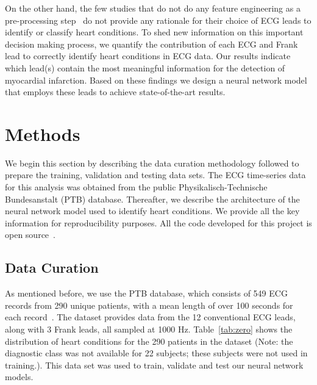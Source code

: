 \documentclass{svproc}
\begin{document}
On the other hand, the few studies that do not do any feature engineering as a pre-processing step~\cite{acharya, liu2} do not provide any rationale for their choice of ECG leads to identify or classify heart conditions. To shed new information on this important decision making process, we quantify the contribution of each ECG and Frank lead to correctly identify heart conditions in ECG data. Our results indicate which lead(s) contain the most meaningful information for the detection of myocardial infarction. Based on these findings we design a neural network model that employs these leads to achieve state-of-the-art results.

\section{Methods}
  
We begin this section by describing the data curation methodology followed to prepare the training, validation and testing data sets. The ECG time-series data for this analysis was obtained from the public Physikalisch-Technische Bundesanstalt (PTB) database. Thereafter, we describe the architecture of the neural network model used to identify heart conditions. We provide all the key information for reproducibility purposes. All the code developed for this project is open source~\cite{heartrepo}.

\subsection{Data Curation}

As mentioned before, we use the PTB database, which consists of 549 ECG records from 290 unique patients, with a mean length of over 100 seconds for each record~\cite{ptbdb}. The dataset provides data from the 12 conventional ECG leads, along with 3 Frank leads, all sampled at 1000 Hz. Table~\ref{tab:zero} shows the distribution of heart conditions for the 290 patients in the dataset (Note: the diagnostic class was not available for 22 subjects; these subjects were not used in training.). This data set was used to train, validate and test our neural network models. 
\end{document}
